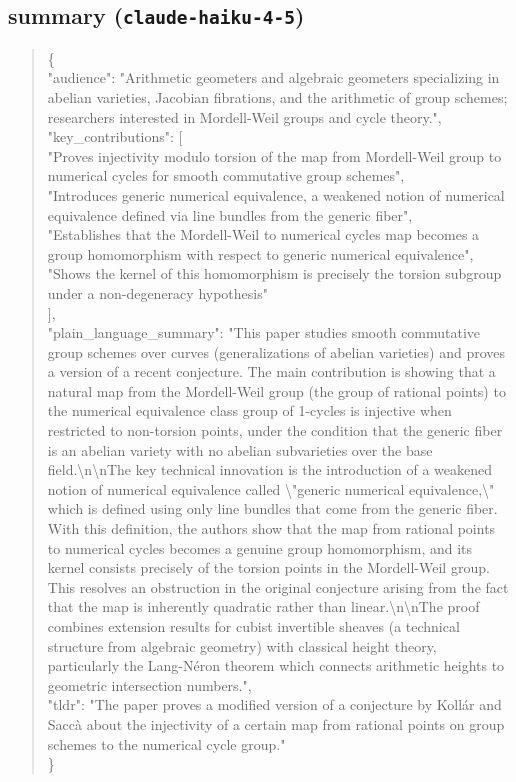 \documentclass[11pt]{article}
\begin{document}
\subsection*{summary (\texttt{claude-haiku-4-5})}
\begin{quote}\small\ttfamily\raggedright
\{\\
  "audience": "Arithmetic geometers and algebraic geometers specializing in abelian varieties, Jacobian fibrations, and the arithmetic of group schemes; researchers interested in Mordell-Weil groups and cycle theory.",\\
  "key\_contributions": [\\
    "Proves injectivity modulo torsion of the map from Mordell-Weil group to numerical cycles for smooth commutative group schemes",\\
    "Introduces generic numerical equivalence, a weakened notion of numerical equivalence defined via line bundles from the generic fiber",\\
    "Establishes that the Mordell-Weil to numerical cycles map becomes a group homomorphism with respect to generic numerical equivalence",\\
    "Shows the kernel of this homomorphism is precisely the torsion subgroup under a non-degeneracy hypothesis"\\
  ],\\
  "plain\_language\_summary": "This paper studies smooth commutative group schemes over curves (generalizations of abelian varieties) and proves a version of a recent conjecture. The main contribution is showing that a natural map from the Mordell-Weil group (the group of rational points) to the numerical equivalence class group of 1-cycles is injective when restricted to non-torsion points, under the condition that the generic fiber is an abelian variety with no abelian subvarieties over the base field.\textbackslash{}n\textbackslash{}nThe key technical innovation is the introduction of a weakened notion of numerical equivalence called \textbackslash{}"generic numerical equivalence,\textbackslash{}" which is defined using only line bundles that come from the generic fiber. With this definition, the authors show that the map from rational points to numerical cycles becomes a genuine group homomorphism, and its kernel consists precisely of the torsion points in the Mordell-Weil group. This resolves an obstruction in the original conjecture arising from the fact that the map is inherently quadratic rather than linear.\textbackslash{}n\textbackslash{}nThe proof combines extension results for cubist invertible sheaves (a technical structure from algebraic geometry) with classical height theory, particularly the Lang-Néron theorem which connects arithmetic heights to geometric intersection numbers.",\\
  "tldr": "The paper proves a modified version of a conjecture by Kollár and Saccà about the injectivity of a certain map from rational points on group schemes to the numerical cycle group."\\
\}\\
\end{quote}
\end{document}

